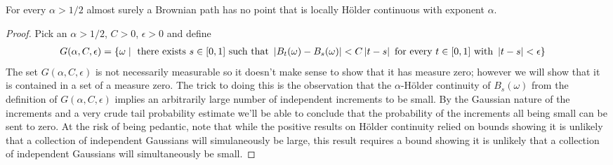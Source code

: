 \begin{thm}\label{BrownianNotHolderContinuous}For every $\alpha > 1/2$ almost surely a Brownian path has
  no point that is locally H\"older continuous with exponent $\alpha$.
\end{thm}
\begin{proof}
Pick an $\alpha > 1/2$, $C > 0$, $\epsilon > 0$ and define
\begin{align*}
G(\alpha, C, \epsilon) &= \lbrace \omega \mid \text{ there exists } s
\in [0,1] \text{ such that } \left \vert B_t(\omega) - B_s(\omega) \right \vert <
C\left \vert t-s \right \vert \text{ for every } t \in [0,1] \text{ with }
\left \vert t-s \right \vert<\epsilon \rbrace
\end{align*}
The set $G(\alpha,C, \epsilon)$ is not necessarily measurable so it
doesn't make sense to show that it has measure zero; however we will
show that it is contained in a set of a measure zero.  The trick to
doing this is the observation that the $\alpha$-H\"older continuity of
$B_s(\omega)$ from the definition of $G(\alpha,C,\epsilon)$ implies an
arbitrarily large number of independent increments to be small.  By
the Gaussian nature of the increments and a very crude tail
probability estimate we'll be able to conclude that the
probability of the increments all being small can be sent to zero.  At
the risk of being pedantic, note that while the positive results on
H\"older continuity relied on bounds showing it is unlikely that a
collection of independent Gaussians will simulaneously be large, this
result requires a bound showing it is unlikely that a collection of
independent Gaussians will simultaneously be small.


\end{proof}
